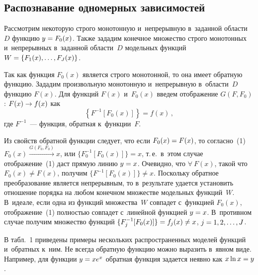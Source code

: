 \begin{multicols}{2}
\subsection{Распознавание одномерных зависимостей}

  Рассмотрим некоторую строго монотонную и~непрерывную в~заданной 
области~$D$ функцию $y\hm= F_0(x)$. Также зададим конечное множество 
строго монотонных и~непрерывных в~заданной области~$D$ модельных 
функций $W\hm= \{ F_1(x),\ldots , F_J(x)\}$.
  
  Так как функция $F_0(x)$ является строго монотонной, то она имеет 
обратную функцию. Зададим произвольную монотонную и~непрерывную 
в~об\-ласти~$D$ функцию $F(x)$. Для функций $F(x)$ и~$F_0(x)$ введем 
отображение $G(F,F_0)$: $F(x)\hm\to f(x)$ как
     \begin{equation}
     \left\{ F^{-1}\left[ F_0(x)\right]\right\} =f(x)\,,
     \label{e1-t}
     \end{equation}
где $F^{-1}$~--- функция, обратная к~функции~$F$.
  
  Из свойств обратной функции следует, что если $F_0(x)\hm= F(x)$, то 
согласно~(1) 
  $F_0(x)  \xrightarrow{G(F_0,F_0)} x$, или $\{ F_0^{-1} [F_0(x)]\}=x$, т.\,е.\ 
в~этом случае отображение~(1) даст прямую линию $y\hm=x$. Очевидно, что 
$\forall\ F(x)$, такой что $F_0(x)\not= F(x)$, получим $\{ F^{-1} 
[F_0(x)]\}\not=x$. Поскольку обратное преобразование является непрерывным, 
то в~результате удается установить отношение порядка на любом конечном 
множестве модельных функций~$W$. В~идеале, если одна из функций 
множества~$W$ совпадет с~функцией $F_0(x)$, отображение~(1) полностью 
совпадет с~линейной функцией $y\hm=x$. В~противном случае получим 
множество функций $\{ F_j^{-1}[F_0(x)]\}\hm= f_j(x)\not= x$,  
$j\hm=1,2,\ldots ,J$.
  
  В табл.~1 приведены примеры нескольких распространенных моделей 
функций и~обратных к~ним. Не всегда обратную функцию можно выразить 
в~явном виде. Например, для функции $y\hm= xe^x$ обратная функция 
задается неявно как $x\ln x\hm=y$.



\end{multicols}
